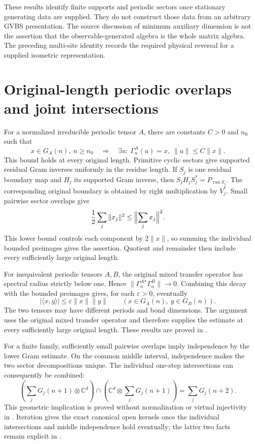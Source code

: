 \documentclass{article}
\begin{document}
These results identify finite supports and periodic sectors once stationary
generating data are supplied. They do not construct those data from an
arbitrary GVBS presentation.
The source discussion of minimum auxiliary dimension is not the assertion
that the observable-generated algebra is the whole matrix algebra. The preceding multi-site identity records the required physical reversal
for a supplied isometric representation.


\section{Original-length periodic overlaps and joint intersections}

For a normalized irreducible periodic tensor $A$, there are constants
$C>0$ and $n_0$ such that
\[
 x\in G_A(n),\ n\geq n_0
 \quad\Longrightarrow\quad
 \exists u:\ \Gamma_n^A(u)=x,\ \|u\|\leq C\|x\|.
\]
This bound holds at every original length. Primitive cyclic sectors give
supported residual Gram inverses uniformly in the residue length. If $S_j$
is one residual boundary map and $H_j$ its supported Gram inverse, then
$S_jH_jS_j^*=P_{\operatorname{ran}S_j}$. The corresponding original boundary
is obtained by right multiplication by $V_j^*$. Small pairwise sector overlaps
give
\[
 \frac12\sum_j\|x_j\|^2\leq\Bigl\|\sum_jx_j\Bigr\|^2.
\]
This lower bound controls each component by $2\|x\|$, so summing the
individual bounded preimages gives the assertion. Quotient and remainder
then include every sufficiently large original length.

For inequivalent periodic tensors $A,B$, the original mixed transfer operator
has spectral radius strictly below one. Hence
$\|\Gamma_n^A{}^*\Gamma_n^B\|\to0$. Combining this decay with the bounded
preimages gives, for each $\varepsilon>0$, eventually
\[
 |\langle x,y\rangle|\leq\varepsilon\|x\|\|y\|
 \qquad(x\in G_A(n),\ y\in G_B(n)).
\]
The two tensors may have different periods and bond dimensions. The argument
uses the original mixed transfer operator and therefore supplies the estimate
at every sufficiently large original length. These results are proved in
.

For a finite family, sufficiently small pairwise overlaps imply independence
by the lower Gram estimate. On the common middle interval, independence makes
the two sector decompositions unique. The individual one-step intersections
can consequently be combined:
\[
 \left(\sum_jG_j(n+1)\otimes\mathbb C^d\right)
 \cap\left(\mathbb C^d\otimes\sum_jG_j(n+1)\right)
 =\sum_jG_j(n+2).
\]
This geometric implication is proved without normalization or virtual
injectivity in
.
Iteration gives the exact canonical open kernels once the individual
intersections and middle independence hold eventually; the latter two facts
remain explicit in
.
\end{document}
